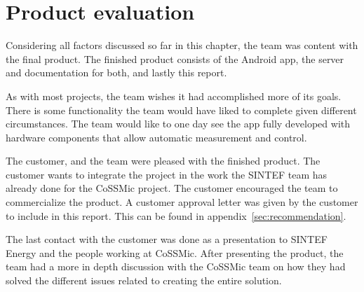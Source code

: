\section{Product evaluation}
Considering all factors discussed so far in this chapter, the team was content with the final product. The finished product consists of the Android app, the server and documentation for both, and lastly this report. 

As with most projects, the team wishes it had accomplished more of its goals. There is some functionality the team would have liked to complete given different circumstances. The team would like to one day see the app fully developed with hardware components that allow automatic measurement and control.

The customer, and the team were pleased with the finished product. The customer wants to integrate the project in the work the SINTEF team has already done for the CoSSMic project. The customer encouraged the team to commercialize the product. A customer approval letter was given by the customer to include in this report. This can be found in appendix~\ref{sec:recommendation}.

The last contact with the customer was done as a presentation to SINTEF Energy and the people working at CoSSMic. After presenting the product, the team had a more in depth discussion with the CoSSMic team on how they had solved the different issues related to creating the entire solution. 

